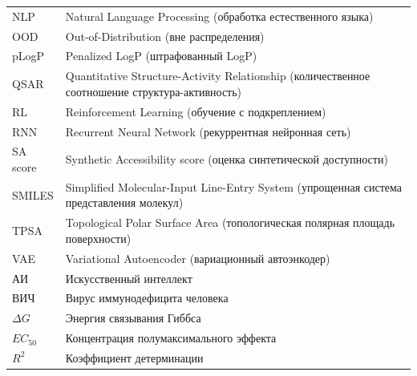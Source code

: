 \documentclass[../main.tex]{subfiles}
\begin{document}
\begin{longtable}{p{}p{}}
NLP & Natural Language Processing (обработка естественного языка) \\
OOD & Out-of-Distribution (вне распределения) \\
pLogP & Penalized LogP (штрафованный LogP) \\
QSAR & Quantitative Structure-Activity Relationship (количественное соотношение структура-активность) \\
RL & Reinforcement Learning (обучение с подкреплением) \\
RNN & Recurrent Neural Network (рекуррентная нейронная сеть) \\
SA score & Synthetic Accessibility score (оценка синтетической доступности) \\
SMILES & Simplified Molecular-Input Line-Entry System (упрощенная система представления молекул) \\
TPSA & Topological Polar Surface Area (топологическая полярная площадь поверхности) \\
VAE & Variational Autoencoder (вариационный автоэнкодер) \\
АИ & Искусственный интеллект \\
ВИЧ & Вирус иммунодефицита человека \\
$\Delta G$ & Энергия связывания Гиббса \\
$EC_{50}$ & Концентрация полумаксимального эффекта \\
$R^2$ & Коэффициент детерминации \\

\end{longtable}
\end{document}
